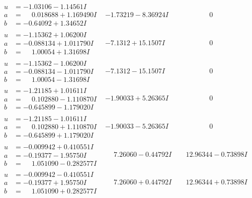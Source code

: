 \documentclass[1p]{elsarticle_modified}
\theoremstyle{definition}
\begin{document}
$$\begin{array}{c|c|c}
\begin{aligned}
u &= -1.03106 - 1.14561 I \\
a &= \phantom{-}0.018688 + 1.169490 I \\
b &= -0.64092 + 1.34652 I\end{aligned}
 & -1.73219 - 8.36924 I & \phantom{-0.000000 } 0 \\ \hline\begin{aligned}
u &= -1.15362 + 1.06200 I \\
a &= -0.088134 + 1.011790 I \\
b &= \phantom{-}1.00054 + 1.31698 I\end{aligned}
 & -7.1312 + 15.1507 I & \phantom{-0.000000 } 0 \\ \hline\begin{aligned}
u &= -1.15362 - 1.06200 I \\
a &= -0.088134 - 1.011790 I \\
b &= \phantom{-}1.00054 - 1.31698 I\end{aligned}
 & -7.1312 - 15.1507 I & \phantom{-0.000000 } 0 \\ \hline\begin{aligned}
u &= -1.21185 + 1.01611 I \\
a &= \phantom{-}0.102880 - 1.110870 I \\
b &= -0.645899 - 1.179020 I\end{aligned}
 & -1.90033 + 5.26365 I & \phantom{-0.000000 } 0 \\ \hline\begin{aligned}
u &= -1.21185 - 1.01611 I \\
a &= \phantom{-}0.102880 + 1.110870 I \\
b &= -0.645899 + 1.179020 I\end{aligned}
 & -1.90033 - 5.26365 I & \phantom{-0.000000 } 0 \\ \hline\begin{aligned}
u &= -0.009942 + 0.410551 I \\
a &= -0.19377 - 1.95750 I \\
b &= \phantom{-}1.051090 - 0.282577 I\end{aligned}
 & \phantom{-}7.26060 - 0.44792 I & \phantom{-}12.96344 - 0.73898 I \\ \hline\begin{aligned}
u &= -0.009942 - 0.410551 I \\
a &= -0.19377 + 1.95750 I \\
b &= \phantom{-}1.051090 + 0.282577 I\end{aligned}
 & \phantom{-}7.26060 + 0.44792 I & \phantom{-}12.96344 + 0.73898 I \\ \hline\begin{aligned}

\end{aligned}
\end{array}$$
\end{document}
